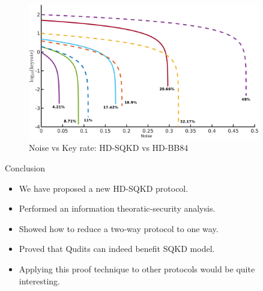 \documentclass[final]{beamer}
\newlength{\sepwid}
\newlength{\onecolwid}
\newlength{\twocolwid}
\begin{document}
\begin{frame}[t]
\begin{columns}[t]
\begin{column}{\twocolwid}
\begin{columns}[t,totalwidth=\twocolwid]
\end{columns} %

\end{column} %

\begin{column}{\sepwid}\end{column} %

\begin{column}{\onecolwid} %


\begin{figure}
	\includegraphics[width=\linewidth]{q_v_kr_to_label_done_small.png}
	\caption{Noise vs Key rate: HD-SQKD vs HD-BB84}
\end{figure}

\begin{block}{Conclusion}

\begin{itemize}
	\item We have proposed a new HD-SQKD protocol.
	\item Performed an information theoratic-security analysis. 
	\item Showed how to reduce a two-way protocol to one way. 
	\item Proved that Qudits can indeed benefit SQKD model. 
		\item Applying this proof technique to other protocols would be quite interesting. 
\end{itemize}

\end{block}


\end{column}
\end{columns}
\end{frame}
\end{document}
